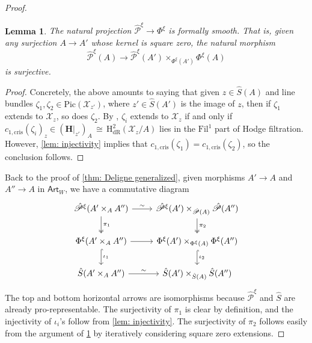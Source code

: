 \documentclass[letter, 11pt]{article}
\theoremstyle{plain}
\newtheorem{lemma}[subsubsection]{Lemma}
\theoremstyle{definition}
\newcommand\iso{\,{\cong}\,}
\newcommand{\<}{\langle}
\renewcommand{\>}{\rangle}
\newcommand{\sX}{\mathcal{X}}
\newcommand{\Pic}{\mathrm{Pic}}
\newcommand{\Fil}{\mathrm{Fil}}
\renewcommand{\H}{\mathrm{H}}
\newcommand{\shP}{\mathscr{P}}
\newcommand{\dR}{\mathrm{dR}}
\newcommand{\cris}{\mathrm{cris}}
\newcommand{\bH}{\mathbf{H}}
\begin{document}
\begin{proof}
\begin{lemma}
\label{lem: formal smoothness}
    The natural projection $\hat{\shP}^\xi \to \Phi^\xi$ is formally smooth. That is, given any surjection $A \to A'$ whose kernel is square zero, the natural morphism 
    $$ \hat{\shP}^\xi(A) \to \hat{\shP}^\xi(A') \times_{\Phi^\xi(A')} \Phi^\xi(A) $$
    is surjective. 
\end{lemma}

\begin{proof}
    Concretely, the above amounts to saying that given $z \in \hat{S}(A)$ and line bundles $\zeta_1, \zeta_2 \in \Pic(\sX_{z'})$, where $z' \in \hat{S}(A')$ is the image of $z$, then if $\zeta_1$ extends to $\sX_z$, so does $\zeta_2$. By \cite[Prop.~1.12]{OgusCrystals}, $\zeta_i$ extends to $\sX_z$ if and only if $c_{1, \cris}(\zeta_i)_z \in (\bH|_{z'})_A \iso \H^2_\dR(\sX_{z}/A)$ lies in the $\Fil^1$ part of Hodge filtration. However, \ref{lem: injectivity} implies that $c_{1, \cris}(\zeta_1) = c_{1, \cris}(\zeta_2)$, so the conclusion follows. 
\end{proof}

    
Back to the proof of \ref{thm: Deligne generalized}, given morphisms $A' \to A$ and $A'' \to A$ in $\mathsf{Art}_W$, we have a commutative diagram 
    \[\begin{tikzcd}
	{\hat{\shP}^\xi(A' \times_A A'')} & {\hat{\shP}^\xi(A') \times_{\hat{\shP}(A)} \hat{\shP}(A'')} \\
	{\Phi^\xi(A' \times_A A'')} & {\Phi^\xi(A') \times_{\Phi^\xi(A)} \Phi^\xi(A'')} \\
	{\hat{S}(A' \times_A A'')} & {\hat{S}(A') \times_{\hat{S}(A)} \hat{S}(A'')}
	\arrow["\sim", from=1-1, to=1-2]
	\arrow["\pi_1", two heads, from=1-1, to=2-1]
	\arrow[from=2-1, to=2-2]
	\arrow["\pi_2", two heads, from=1-2, to=2-2]
	\arrow["\iota_1", hook, from=2-1, to=3-1]
	\arrow["\sim", from=3-1, to=3-2]
	\arrow["\iota_2", hook, from=2-2, to=3-2]
    \end{tikzcd}\]
     The top and bottom horizontal arrows are isomorphisms because $\hat{\shP}^\xi$ and $\hat{S}$ are already pro-representable. The surjectivity of $\pi_1$ is clear by definition, and the injectivity of $\iota_i$'s follow from \ref{lem: injectivity}. The surjectivity of $\pi_2$ follows easily from the argument of \ref{lem: formal smoothness} by iteratively considering square zero extensions. 
     

\end{proof}
\end{document}
